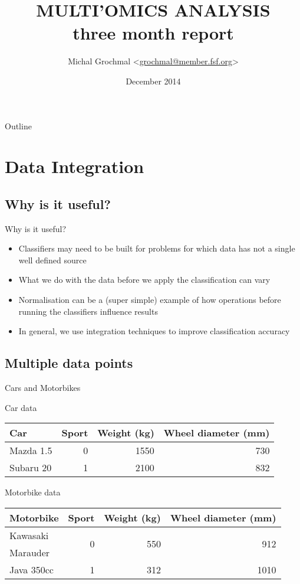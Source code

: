 \documentclass[hyperref={colorlinks=true}]{beamer}
\title{MULTI'OMICS ANALYSIS \\ three month report}
\author{Michal Grochmal
  <\href{mailto:grochmal@member.fsf.org}{grochmal@member.fsf.org}>}
\institute{Queen Mary University of London}
\date{December 2014}
\begin{document}
\begin{frame}
  \titlepage
\end{frame}

\begin{frame}{Outline}
  \tableofcontents[pausesections]
\end{frame}

\section{Data Integration}

\subsection{Why is it useful?}
\begin{frame}{Why is it useful?}
  \begin{itemize}
    \item Classifiers may need to be built for problems for which data has not
          a single well defined source
    \item What we do with the data before we apply the classification can vary
    \item Normalisation can be a (super simple) example of how operations
          before running the classifiers influence results
    \item In general, we use integration techniques to improve classification
          accuracy
  \end{itemize}
\end{frame}

\subsection{Multiple data points}
\begin{frame}{Cars and Motorbikes}
  \begin{block}{Car data}
    \begin{tabular}{l|r|rr}
    Car & Sport & Weight (kg) & Wheel diameter (mm) \\
    \hline
    Mazda 1.5 & 0 & 1550 & 730 \\
    Subaru 20 & 1 & 2100 & 832 \\
    \hline
    \end{tabular}
  \end{block}
  \begin{block}{Motorbike data}
    \begin{tabular}{l|r|rr}
    Motorbike & Sport & Weight (kg) & Wheel diameter (mm) \\
    \hline
    Kawasaki   & \multirow{2}{*}{0}
               & \multirow{2}{*}{550}
               & \multirow{2}{*}{912} \\
    Marauder   & & & \\
    Java 350cc & 1 &  312 & 1010 \\
    \hline
    \end{tabular}
  \end{block}
\end{frame}
\end{document}
